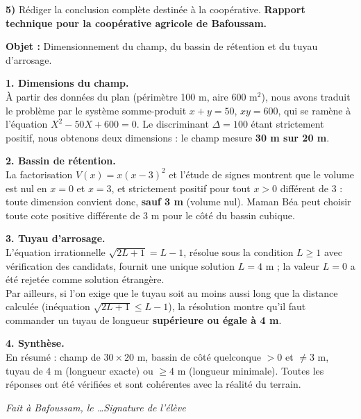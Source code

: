 \documentclass[11pt]{article}
\newcounter{popsec}
\newcounter{popsub}
\newcommand{\courssub}[1]{%
  \stepcounter{popsub}%
  \par\vspace{9pt}\noindent{\popxbold\fontsize{11.5}{13}\selectfont\color{popink}{\color{poporange}\thepopsec.\thepopsub}\hspace{6pt}#1}\par\nopagebreak\vspace{4pt}
}
\begin{document}
\begin{exoresolu}
\textbf{5)} Rédiger la conclusion complète destinée à la coopérative.
\tcblower
\textbf{Rapport technique pour la coopérative agricole de Bafoussam.}

\textbf{Objet :} Dimensionnement du champ, du bassin de rétention et du tuyau d'arrosage.

\textbf{1. Dimensions du champ.} \\
À partir des données du plan (périmètre 100 m, aire 600 m$^2$), nous avons traduit le problème par le système somme-produit $x + y = 50$, $xy = 600$, qui se ramène à l'équation $X^2 - 50X + 600 = 0$. Le discriminant $\Delta = 100$ étant strictement positif, nous obtenons deux dimensions : le champ mesure \textbf{30 m sur 20 m}.

\textbf{2. Bassin de rétention.} \\
La factorisation $V(x) = x(x-3)^2$ et l'étude de signes montrent que le volume est nul en $x = 0$ et $x = 3$, et strictement positif pour tout $x > 0$ différent de $3$ : toute dimension convient donc, \textbf{sauf 3 m} (volume nul). Maman Béa peut choisir toute cote positive différente de 3 m pour le côté du bassin cubique.

\textbf{3. Tuyau d'arrosage.} \\
L'équation irrationnelle $\sqrt{2L+1} = L - 1$, résolue sous la condition $L \geq 1$ avec vérification des candidats, fournit une unique solution $L = 4$ m ; la valeur $L = 0$ a été rejetée comme solution étrangère. \\
Par ailleurs, si l'on exige que le tuyau soit au moins aussi long que la distance calculée (inéquation $\sqrt{2L+1} \leq L - 1$), la résolution montre qu'il faut commander un tuyau de longueur \textbf{supérieure ou égale à 4 m}.

\textbf{4. Synthèse.} \\
En résumé : champ de $30 \times 20$ m, bassin de côté quelconque $>0$ et $\neq 3$ m, tuyau de 4 m (longueur exacte) ou $\geq 4$ m (longueur minimale). Toutes les réponses ont été vérifiées et sont cohérentes avec la réalité du terrain.

\textit{Fait à Bafoussam, le \dots \hfill Signature de l'élève}
\end{exoresolu}

\courssub{Bilan de l'activité}
\end{document}
